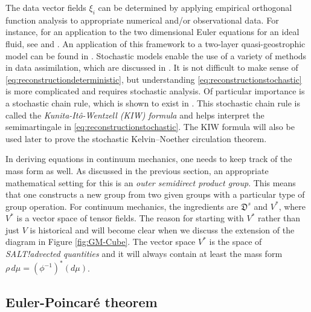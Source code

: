 \documentclass[11pt, oneside]{article}   	%
\numberwithin{equation}{section}
\theoremstyle{plain}
\theoremstyle{definition}
\theoremstyle{remark}
\newcommand{\<}{\langle}
\renewcommand{\>}{\rangle}
\begin{document}
The data vector fields $\xi_i$ can be determined by applying empirical orthogonal function analysis to appropriate numerical and/or observational data. For instance, for an application to the two dimensional Euler equations for an ideal fluid, see \cite{cotter2019numerically} and \cite{ephrati2023data}. An application of this framework to a two-layer quasi-geostrophic model can be found in \cite{cotter2018modelling}. Stochastic models enable the use of a variety of methods in data assimilation, which are discussed in \cite{cotter2019particle}. It is not difficult to make sense of \eqref{eq:reconstructiondeterministic}, but understanding \eqref{eq:reconstructionstochastic} is more complicated and requires stochastic analysis. Of particular importance is a stochastic chain rule, which is shown to exist in \cite{de2020implications}. This stochastic chain rule is called the \emph{Kunita-It\^o-Wentzell (KIW) formula} and helps interpret the semimartingale in \eqref{eq:reconstructionstochastic}. The KIW formula will also be used later to prove the stochastic Kelvin--Noether circulation theorem.   
  

In deriving equations in continuum mechanics, one needs to keep track of the mass form as well. As discussed in the previous section, an appropriate mathematical setting for this is an \emph{outer semidirect product group}. This means that one constructs a new group from two given groups with a particular type of group operation. For continuum mechanics, the ingredients are $\mathfrak{D}^s$ and $V^*$, where $V^*$ is a vector space of tensor fields. The reason for starting with $V^*$ rather than just $V$ is historical and will become clear when we discuss the extension of the diagram in Figure \ref{fig:GM-Cube}. The vector space $V^*$ is the space of \emph{SALT!advected quantities} and it will always contain at least the mass form $\rho\,d\mu=(\phi^{-1})^*(d\mu)$.  \smallskip
{}

\subsection{Euler-Poincar\'e theorem}  
\end{document}
